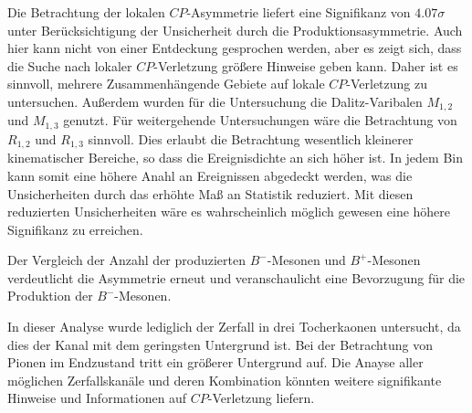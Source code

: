 Die Betrachtung der lokalen $CP$-Asymmetrie liefert eine Signifikanz
von $4.07\sigma$ unter Berücksichtigung der Unsicherheit durch die
Produktionsasymmetrie. Auch hier kann nicht von einer Entdeckung
gesprochen werden, aber es zeigt sich, dass die Suche nach lokaler $CP$-Verletzung
größere Hinweise geben kann. Daher ist es sinnvoll, mehrere Zusammenhängende
Gebiete auf lokale $CP$-Verletzung zu untersuchen.
Außerdem wurden für die Untersuchung die Dalitz-Varibalen $M_{1,2}$ und $M_{1,3}$ genutzt.
Für weitergehende Untersuchungen wäre die Betrachtung von $R_{1,2}$ und $R_{1,3}$ sinnvoll.
Dies erlaubt die Betrachtung wesentlich kleinerer kinematischer Bereiche, so dass die Ereignisdichte an sich höher ist.
In jedem Bin kann somit eine höhere Anahl an Ereignissen abgedeckt werden, was die Unsicherheiten durch das erhöhte Maß an Statistik reduziert.
Mit diesen reduzierten Unsicherheiten wäre es wahrscheinlich möglich gewesen eine höhere Signifikanz zu erreichen. \par

Der Vergleich der Anzahl der produzierten $B^-$-Mesonen und $B^+$-Mesonen
verdeutlicht die Asymmetrie erneut und veranschaulicht eine Bevorzugung für die
Produktion der $B^-$-Mesonen. \par

In dieser Analyse wurde lediglich der Zerfall in drei Tocherkaonen untersucht, da
dies der Kanal mit dem geringsten Untergrund ist. Bei der Betrachtung von Pionen
im Endzustand tritt ein größerer Untergrund auf. Die Anayse aller möglichen
Zerfallskanäle und deren Kombination könnten weitere signifikante Hinweise und
Informationen auf $CP$-Verletzung liefern.
